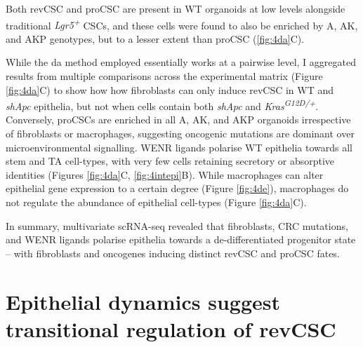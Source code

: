 Both revCSC and proCSC are present in WT organoids at low levels alongside traditional \textit{Lgr5\textsuperscript{+}} CSCs, and these cells were found to also be enriched by A, AK, and AKP genotypes, but to a lesser extent than proCSC (\ref{fig:4da}C).

While the \acrshort{da} method employed essentially works at a pairwise level, I aggregated results from multiple comparisons across the experimental matrix (Figure \ref{fig:4da}C) to show how how fibroblasts can only induce revCSC in WT and \textit{shApc} epithelia, but not when cells contain both \textit{shApc} and \textit{Kras\textsuperscript{G12D/+}}. Conversely, proCSCs are enriched in all A, AK, and AKP organoids irrespective of fibroblasts or macrophages, suggesting oncogenic mutations are dominant over microenvironmental signalling. WENR ligands polarise WT epithelia towards all stem and TA cell-types, with very few cells retaining secretory or absorptive identities (Figures \ref{fig:4da}C, \ref{fig:4intepi}B). While macrophages can alter epithelial gene expression to a certain degree (Figure \ref{fig:4de}), macrophages do not regulate the abundance of epithelial cell-types (Figure \ref{fig:4da}C). 

In summary, multivariate scRNA-seq revealed that fibroblasts, CRC mutations, and WENR ligands polarise epithelia towards a de-differentiated progenitor state – with fibroblasts and oncogenes inducing distinct revCSC and proCSC fates.

\section{Epithelial dynamics suggest transitional regulation of revCSC}


